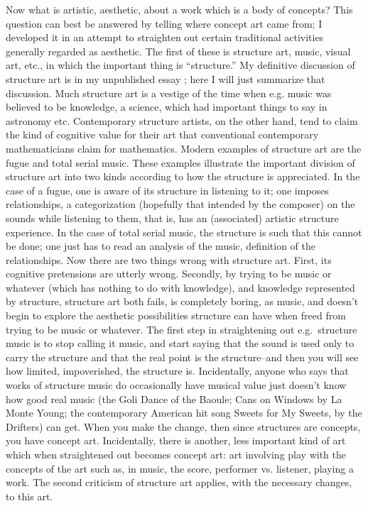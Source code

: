 Now what is artistic, aesthetic, about a work which is a body of 
concepts? This question can best be answered by telling where concept art 
came from; I developed it in an attempt to straighten out certain traditional 
activities generally regarded as aesthetic. The first of these is structure art, 
music, visual art, etc., in which the important thing is \enquote{structure.} My 
definitive discussion of structure art is in my unpublished essay ; here I will just summarize that discussion. Much 
structure art is a vestige of the time when e.g. music was believed to be 
knowledge, a science, which had important things to say in astronomy etc.
Contemporary structure artists, on the other hand, tend to claim the kind of 
cognitive value for their art that conventional contemporary mathematicians 
claim for mathematics. Modern examples of structure art are the fugue and 
total serial music. These examples illustrate the important division of 
structure art into two kinds according to how the structure is appreciated. In 
the case of a fugue, one is aware of its structure in listening to it; one 
imposes relationships, a categorization (hopefully that intended by the 
composer) on the sounds while listening to them, that is, has an (associated) 
artistic structure experience. In the case of total serial music, the structure is 
such that this cannot be done; one just has to read an analysis of the 
music, definition of the relationships. Now there are two things wrong with 
structure art. First, its cognitive pretensions are utterly wrong. Secondly, by 
trying to be music or whatever (which has nothing to do with knowledge), 
and knowledge represented by structure, structure art both fails, is 
completely boring, as music, and doesn't begin to explore the aesthetic 
possibilities structure can have when freed from trying to be music or 
whatever. The first step in straightening out e.g.\ structure music is to stop 
calling it music, and start saying that the sound is used only to carry the 
structure and that the real point is the structure--and then you will see how 
limited, impoverished, the structure is. Incidentally, anyone who says that 
works of structure music do occasionally have musical value just doesn't 
know how good real music (the Goli Dance of the Baoule; Cans on Windows 
by La Monte Young; the contemporary American hit song Sweets for My 
Sweets, by the Drifters) can get. When you make the change, then since 
structures are concepts, you have concept art. Incidentally, there is another, 
less important kind of art which when straightened out becomes concept art: 
art involving play with the concepts of the art such as, in music, the score, 
performer vs. listener, playing a work. The second criticism of structure art 
applies, with the necessary changes, to this art. 


